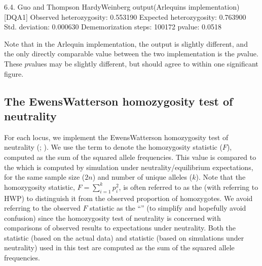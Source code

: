 \documentclass[letterpaper,10pt,english,openany,oneside]{sphinxmanual}
\begin{document}
\begin{sphinxVerbatim}[commandchars=\\\{\}]
6.4. Guo and Thompson HardyWeinberg output(Arlequin\PYGZsq{}s implementation) [DQA1]
\PYGZhy{}\PYGZhy{}\PYGZhy{}\PYGZhy{}\PYGZhy{}\PYGZhy{}\PYGZhy{}\PYGZhy{}\PYGZhy{}\PYGZhy{}\PYGZhy{}\PYGZhy{}\PYGZhy{}\PYGZhy{}\PYGZhy{}\PYGZhy{}\PYGZhy{}\PYGZhy{}\PYGZhy{}\PYGZhy{}\PYGZhy{}\PYGZhy{}\PYGZhy{}\PYGZhy{}\PYGZhy{}\PYGZhy{}\PYGZhy{}\PYGZhy{}\PYGZhy{}\PYGZhy{}\PYGZhy{}\PYGZhy{}\PYGZhy{}\PYGZhy{}\PYGZhy{}\PYGZhy{}\PYGZhy{}\PYGZhy{}\PYGZhy{}\PYGZhy{}\PYGZhy{}\PYGZhy{}\PYGZhy{}\PYGZhy{}\PYGZhy{}\PYGZhy{}\PYGZhy{}\PYGZhy{}\PYGZhy{}\PYGZhy{}\PYGZhy{}\PYGZhy{}\PYGZhy{}\PYGZhy{}\PYGZhy{}\PYGZhy{}\PYGZhy{}\PYGZhy{}\PYGZhy{}\PYGZhy{}\PYGZhy{}\PYGZhy{}\PYGZhy{}\PYGZhy{}\PYGZhy{}\PYGZhy{}\PYGZhy{}\PYGZhy{}\PYGZhy{}\PYGZhy{}\PYGZhy{}\PYGZhy{}\PYGZhy{}\PYGZhy{}\PYGZhy{}\PYGZhy{}\PYGZhy{}
Observed heterozygosity: 0.553190
Expected heterozygosity: 0.763900
Std. deviation: 0.000630
Dememorization steps: 100172
p\PYGZhy{}value: 0.0518
\end{sphinxVerbatim}

\sphinxAtStartPar
Note that in the Arlequin implementation, the output is slightly
different, and the only directly comparable value between the two
implementation is the \(p\)\sphinxhyphen{}value. These \(p\)\sphinxhyphen{}values may be slightly
different, but should agree to within one significant figure.


\subsection{The Ewens\sphinxhyphen{}Watterson homozygosity test of neutrality}
\label{\detokenize{docs/guide-chapter-instructions:the-ewens-watterson-homozygosity-test-of-neutrality}}\label{\detokenize{docs/guide-chapter-instructions:instructions-homozygosity}}
\sphinxAtStartPar
For each locus, we implement the Ewens\sphinxhyphen{}Watterson homozygosity test of
neutrality (; ). We use the term
 to denote the homozygosity statistic
(\(F\)), computed as the sum of the squared allele
frequencies. This value is compared to the 
which is computed by simulation under neutrality/equilibrium
expectations, for the same sample size (\(2n\)) and number of
unique alleles (\(k\)). Note that the homozygosity 
statistic, \(F=\sum_{i=1}^{k}p_{i}^{2}\), is often referred to as
the  (with  referring to HWP) to
distinguish it from the observed proportion of homozygotes. We avoid
referring to the observed \(F\) statistic as the “” (to simplify and hopefully avoid confusion)
since the homozygosity test of neutrality is concerned with
comparisons of observed results to expectations under neutrality. Both
the  statistic (based on the actual data) and 
statistic (based on simulations under neutrality) used in this test
are computed as the sum of the squared allele frequencies.
\end{document}
